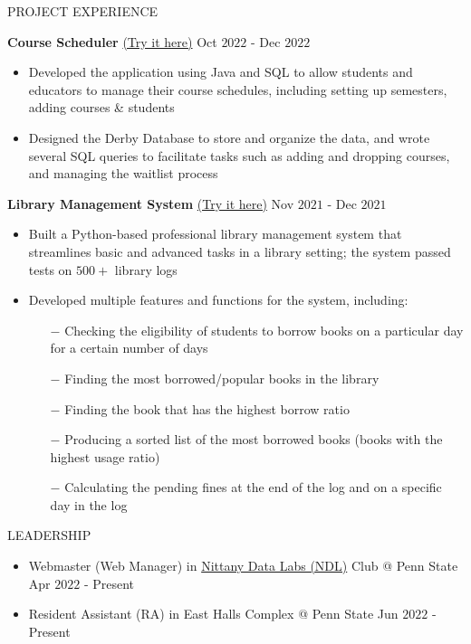 \documentclass{resume} %
\begin{document}
\begin{rSection}{PROJECT EXPERIENCE}

\textbf{Course Scheduler }{\href{https://github.com/harshitjain17/OOP-with-Web-based-Applications-in-Java-/tree/main/CourseSchedulerHarshitJainhmj5262}{(Try it here)}} \hfill Oct $2022$ - Dec $2022$
\begin{itemize}
    \itemsep -3pt {}
    \item Developed the application using Java and SQL to allow students and educators to manage their course schedules, including setting up semesters, adding courses \& students
    \item Designed the Derby Database to store and organize the data, and wrote several SQL queries to facilitate tasks such as adding and dropping courses, and managing the waitlist process
\end{itemize}


\textbf{Library Management System }{\href{https://github.com/harshitjain17/Library-Management-System}{(Try it here)}} \hfill Nov $2021$ - Dec $2021$
\begin{itemize}
    \itemsep -3pt {}
    \item Built a Python-based professional library management system that streamlines basic and advanced tasks in a library setting; the system passed tests on $500+$ library logs
    \item Developed multiple features and functions for the system, including:
    \begin{itemize}
        \itemsep -3pt {}
        \item[$-$] Checking the eligibility of students to borrow books on a particular day for a certain number of days
        \item[$-$] Finding the most borrowed/popular books in the library
        \item[$-$] Finding the book that has the highest borrow ratio
        \item[$-$] Producing a sorted list of the most borrowed books (books with the highest usage ratio)
        \item[$-$] Calculating the pending fines at the end of the log and on a specific day in the log
    \end{itemize}
\end{itemize}

\end{rSection} 


\begin{rSection}{LEADERSHIP} 
\begin{itemize}
    \itemsep -3pt {}
    \item Webmaster (Web Manager) in \href{https://ndl.psu.edu/}{Nittany Data Labs (NDL)} Club @ Penn State \hfill Apr $2022$ - Present
    \item Resident Assistant (RA) in East Halls Complex @ Penn State \hfill Jun $2022$ - Present
\end{itemize}


\end{rSection}
\end{document}
